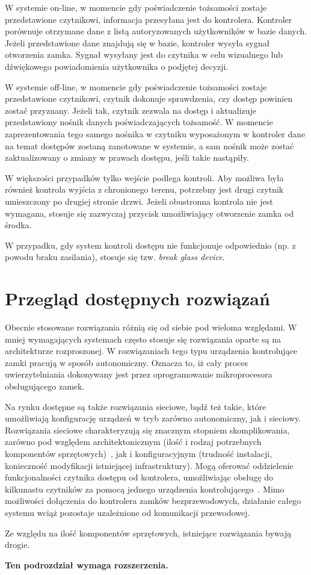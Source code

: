 		W systemie on-line, w momencie gdy poświadczenie tożsamości zostaje przedstawione czytnikowi, informacja przesyłana jest do kontrolera. Kontroler porównuje otrzymane dane z listą autoryzowanych użytkowników w bazie danych. Jeżeli przedstawione dane znajdują się w bazie, kontroler wysyła sygnał otworzenia zamka. Sygnał wysyłany jest do czytnika w celu wizualnego lub dźwiękowego powiadomienia użytkownika o podjętej decyzji.~\cite{bsia2016}

		W systemie off-line, w momencie gdy poświadczenie tożsamości zostaje przedstawione czytnikowi, czytnik dokonuje sprawdzenia, czy dostęp powinien zostać przyznany. Jeżeli tak, czytnik zezwala na dostęp i aktualizuje przedstawiony nośnik danych poświadczających tożsamość. W momencie zaprezentowania tego samego nośnika w czytniku wyposażonym w kontroler dane na temat dostępów zostaną zanotowane w systemie, a sam nośnik może zostać zaktualizowany o zmiany w prawach dostępu, jeśli takie nastąpiły.~\cite{bsia2016}

		W większości przypadków tylko wejście podlega kontroli. Aby możliwa była również kontrola wyjścia z chronionego terenu, potrzebny jest drugi czytnik umieszczony po drugiej stronie drzwi. Jeżeli obustronna kontrola nie jest wymagana, stosuje się zazwyczaj przycisk umożliwiający otworzenie zamka od środka.~\cite{bsia2016}

		W przypadku, gdy system kontroli dostępu nie funkcjonuje odpowiednio (np. z powodu braku zasilania), stosuje się tzw. \textit{break glass device}.~\cite{bsia2016}

	\section{Przegląd dostępnych rozwiązań}

		Obecnie stosowane rozwiązania różnią się od siebie pod wieloma względami. W mniej wymagających systemach często stosuje się rozwiązania oparte są na architekturze rozproszonej. W rozwiązaniach tego typu urządzenia kontrolujące zamki pracują w sposób autonomiczny. Oznacza to, iż cały proces uwierzytelniania dokonywany jest przez oprogramowanie mikroprocesora obsługującego zamek.

		Na rynku dostępne są także rozwiązania sieciowe, bądź też takie, które umożliwiają konfigurację urządzeń w tryb zarówno autonomiczny, jak i sieciowy. Rozwiązania sieciowe charakteryzują się znacznym stopniem skomplikowania, zarówno pod względem architektonicznym (ilość i rodzaj potrzebnych komponentów sprzętowych)~\cite{racs5}, jak i konfiguracyjnym (trudność instalacji, konieczność modyfikacji istniejącej infrastruktury). Mogą oferować oddzielenie funkcjonalności czytnika dostępu od kontrolera, umożliwiając obsługę do kilkunastu czytników za pomocą jednego urządzenia kontrolującego~\cite{racs5}. Mimo możliwości dołączenia do kontrolera zamków bezprzewodowych, działanie całego systemu wciąż pozostaje uzależnione od komunikacji przewodowej.

		Ze względu na ilość komponentów sprzętowych, istniejące rozwiązania bywają drogie.

		\textbf{Ten podrozdział wymaga rozszerzenia.}